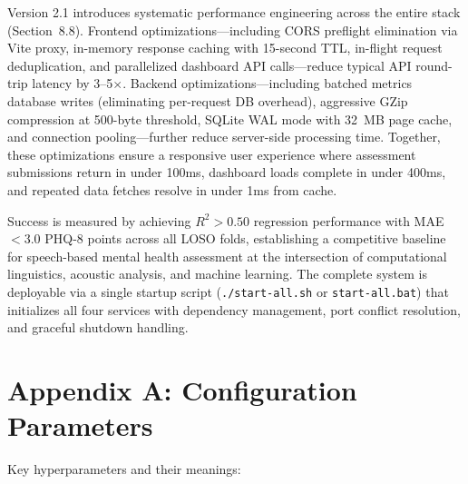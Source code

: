 \documentclass[12pt]{article}
\begin{document}
	Version 2.1 introduces systematic performance engineering across the entire stack (Section~8.8). Frontend optimizations---including CORS preflight elimination via Vite proxy, in-memory response caching with 15-second TTL, in-flight request deduplication, and parallelized dashboard API calls---reduce typical API round-trip latency by 3--5$\times$. Backend optimizations---including batched metrics database writes (eliminating per-request DB overhead), aggressive GZip compression at 500-byte threshold, SQLite WAL mode with 32~MB page cache, and connection pooling---further reduce server-side processing time. Together, these optimizations ensure a responsive user experience where assessment submissions return in under 100ms, dashboard loads complete in under 400ms, and repeated data fetches resolve in under 1ms from cache.

	Success is measured by achieving $R^2 > 0.50$ regression performance with MAE $< 3.0$ PHQ-8 points across all LOSO folds, establishing a competitive baseline for speech-based mental health assessment at the intersection of computational linguistics, acoustic analysis, and machine learning. The complete system is deployable via a single startup script (\texttt{./start-all.sh} or \texttt{start-all.bat}) that initializes all four services with dependency management, port conflict resolution, and graceful shutdown handling.

	\newpage


	\section*{Appendix A: Configuration Parameters}

	Key hyperparameters and their meanings:
\end{document}
